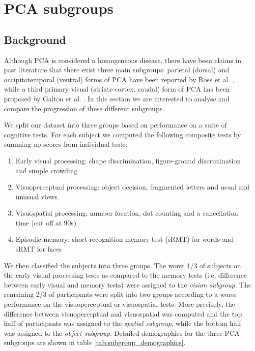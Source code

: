 \section{PCA subgroups}
\label{ebm:pca_subgroups}

\subsection{Background}

Although PCA is considered a homogeneous disease, there have been claims in past literature that there exist three main subgroups\cite{lehmann2011basic}: parietal (dorsal) and occipitotemporal (ventral) forms of PCA have been reported by Ross et al. \cite{ross1996progressive}, while a third primary visual (striate cortex, caudal) form of PCA has been proposed by Galton et al. \cite{galton2000atypical}. In this section we are interested to analyse and compare the progression of these different subgroups. 

We split our dataset into three groups based on performance on a suite of cognitive tests. For each subject we computed the following composite tests by summing up scores from individual tests:
\begin{enumerate}
 \item Early visual processing: shape discrimination, figure-ground discrimination and simple crowding
 \item Visuoperceptual processing: object decision, fragmented letters and usual and unusual views.
 \item Visuospatial processing: number location, dot counting and a cancellation time (cut off at 90s)
 \item Episodic memory: short recognition memory test (sRMT) for words and sRMT for faces
\end{enumerate}
We then classified the subjects into three groups. The worst 1/3 of subjects on the early visual processing tests as compared to the memory tests (i.e. difference between early visual and memory tests) were assigned to the \emph{vision subgroup}. The remaining 2/3 of participants were split into two groups according to a worse performance on the visuoperceptual or visuospatial tests. More precisely, the difference between visuoperceptual and visuospatial was computed and the top half of participants was assigned to the \emph{spatial subgroup}, while the bottom half was assigned to the \emph{object subgroup}. Detailed demographics for the three PCA subgroups are shown in table \ref{tab:subgroup_demographics}.

